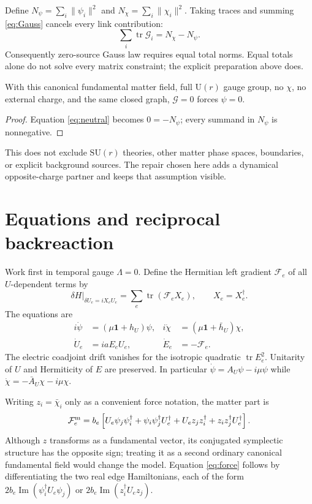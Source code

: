 \documentclass[11pt,a4paper]{article}
\newcommand{\tr}{\operatorname{tr}}\newcommand{\Rea}{\operatorname{Re}}\newcommand{\Ima}{\operatorname{Im}}
\newcommand{\U}{\mathrm U}\newcommand{\id}{\mathbf1}\newcommand{\dd}{\mathrm d}
\begin{document}
Define $N_\psi=\sum_i\|\psi_i\|^2$ and $N_\chi=\sum_i\|\chi_i\|^2$. Taking traces and summing \eqref{eq:Gauss} cancels every link contribution:
\begin{equation}
 \sum_i\tr\mathcal G_i=N_\chi-N_\psi.\label{eq:neutral}
\end{equation}
Consequently zero-source Gauss law requires equal total norms. Equal totals alone do not solve every matrix constraint; the explicit preparation above does.

\begin{proposition}
With this canonical fundamental matter field, full $\U(r)$ gauge group, no $\chi$, no external charge, and the same closed graph, $\mathcal G=0$ forces $\psi=0$.
\end{proposition}
\begin{proof}Equation \eqref{eq:neutral} becomes $0=-N_\psi$; every summand in $N_\psi$ is nonnegative.\end{proof}
This does not exclude $\mathrm{SU}(r)$ theories, other matter phase spaces, boundaries, or explicit background sources. The repair chosen here adds a dynamical opposite-charge partner and keeps that assumption visible.

\newpage
\section{Equations and reciprocal backreaction}
Work first in temporal gauge $\Lambda=0$. Define the Hermitian left gradient $\mathcal F_e$ of all $U$-dependent terms by
\[
 \delta H\big|_{\delta U_e=iX_eU_e}=\sum_e\tr(\mathcal F_eX_e),
 \qquad X_e=X_e^\dagger.
\]
The equations are
\begin{align}
i\dot\psi&=(\mu\id+h_U)\psi,&i\dot\chi&=(\mu\id+\bar h_U)\chi,\label{eq:matter}\\
\dot U_e&=iaE_eU_e,&\dot E_e&=-\mathcal F_e.\label{eq:field}
\end{align}
The electric coadjoint drift vanishes for the isotropic quadratic $\tr E_e^2$. Unitarity of $U$ and Hermiticity of $E$ are preserved. In particular $\dot\psi=A_U\psi-i\mu\psi$ while $\dot\chi=-\bar A_U\chi-i\mu\chi$.

Writing $z_i=\bar\chi_i$ only as a convenient force notation, the matter part is
\begin{equation}
\mathcal F_e^{\rm m}=b_e\left[
 U_e\psi_j\psi_i^\dagger+\psi_i\psi_j^\dagger U_e^\dagger
+U_ez_jz_i^\dagger+z_iz_j^\dagger U_e^\dagger\right].\label{eq:force}
\end{equation}
Although $z$ transforms as a fundamental vector, its conjugated symplectic structure has the opposite sign; treating it as a second ordinary canonical fundamental field would change the model. Equation \eqref{eq:force} follows by differentiating the two real edge Hamiltonians, each of the form $2b_e\Ima(\psi_i^\dagger U_e\psi_j)$ or $2b_e\Ima(z_i^\dagger U_ez_j)$.
\end{document}
